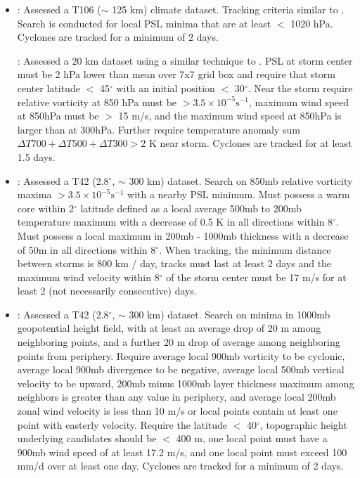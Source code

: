 \documentclass[gmdd, hvmath, online]{copernicus_discussions}
\begin{document}
\begin{itemize}
\item \cite{sugi2002influence}:  Assessed a T106 ($\sim$ 125 km) climate dataset.  Tracking criteria similar to \cite{bengtsson1995hurricane}.  Search is conducted for local PSL minima that are at least $<$ 1020 hPa.  Cyclones are tracked for a minimum of 2 days.

\cite{oouchi2006tropical}:  Assessed a 20 km dataset using a similar technique to \cite{sugi2002influence}.  PSL at storm center must be 2 hPa lower than mean over 7x7 grid box and require that storm center latitude $<$ 45$^\circ$ with an initial position $<$ 30$^\circ$.  Near the storm require relative vorticity at 850 hPa must be $> 3.5 \times 10^{-5} \mbox{s}^{-1}$, maximum wind speed at 850hPa must be $>$ 15 m/s, and the maximum wind speed at 850hPa is larger than at 300hPa.  Further require temperature anomaly sum $\Delta T700+ \Delta T500+ \Delta T300 > 2$ K near storm.  Cyclones are tracked for at least 1.5 days.

\item \cite{vitart1997simulation, vitart1999impact, vitart2001sensitivity}:  Assessed a T42 (2.8$^\circ$, $\sim$ 300 km) dataset.  Search on 850mb relative vorticity maxima $> 3.5 \times 10^{-5} \mbox{s}^{-1}$ with a nearby PSL minimum.  Must possess a warm core within 2$^\circ$ latitude defined as a local average 500mb to 200mb temperature maximum with a decrease of 0.5 K in all directions within 8$^\circ$.  Must possess a local maximum in 200mb - 1000mb thickness with a decrease of 50m in all directions within 8$^\circ$.  When tracking, the minimum distance between storms is 800 km / day, tracks must last at least 2 days and the maximum wind velocity within 8$^\circ$ of the storm center must be 17 m/s for at least 2 (not necessarily consecutive) days.

\item \cite{tsutsui1996simulated}:  Assessed a T42 (2.8$^\circ$, $\sim$ 300 km) dataset.  Search on minima in 1000mb geopotential height field, with at least an average drop of 20 m among neighboring points, and a further 20 m drop of average among neighboring points from periphery.  Require average local 900mb vorticity to be cyclonic, average local 900mb divergence to be negative, average local 500mb vertical velocity to be upward, 200mb minus 1000mb layer thickness maximum among neighbors is greater than any value in periphery, and average local 200mb zonal wind velocity is less than 10 m/s or local points contain at least one point with easterly velocity.  Require the latitude $<$ 40$^\circ$, topographic height underlying candidates should be $<$ 400 m, one local point must have a 900mb wind speed of at least 17.2 m/s, and one local point must exceed 100 mm/d over at least one day.  Cyclones are tracked for a minimum of 2 days.


\end{itemize}
\end{document}
